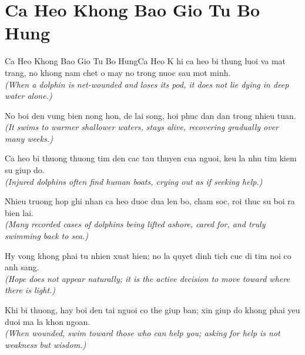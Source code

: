 \section{Ca Heo Khong Bao Gio Tu Bo Hung}
\begin{truyen}{Ca Heo Khong Bao Gio Tu Bo Hung}{Ca Heo}
K hi ca heo bi thung luoi va mat trang, no khong nam chet o may no trong nuoc sau mot minh.\\
\textit{(When a dolphin is net-wounded and loses its pod, it does not lie dying in deep water alone.)}

No boi den vung bien nong hon, de lai song, hoi phuc dan dan trong nhieu tuan.\\
\textit{(It swims to warmer shallower waters, stays alive, recovering gradually over many weeks.)}

Ca heo bi thuong thuong tim den cac tau thuyen cua nguoi, keu la nhu tim kiem su giup do.\\
\textit{(Injured dolphins often find human boats, crying out as if seeking help.)}

Nhieu truong hop ghi nhan ca heo duoc dua len bo, cham soc, roi thuc su boi ra bien lai.\\
\textit{(Many recorded cases of dolphins being lifted ashore, cared for, and truly swimming back to sea.)}

Hy vong khong phai tu nhien xuat hien; no la quyet dinh tich cuc di tim noi co anh sang.\\
\textit{(Hope does not appear naturally; it is the active decision to move toward where there is light.)}

\end{truyen}
\begin{baihoc}
  Khi bi thuong, hay boi den tai nguoi co the giup ban; xin giup do khong phai yeu duoi ma la khon ngoan.\\
  \textit{(When wounded, swim toward those who can help you; asking for help is not weakness but wisdom.)}
\end{baihoc}

